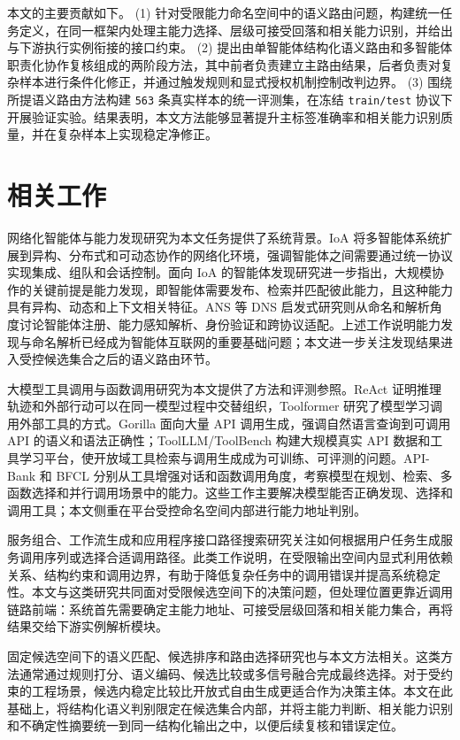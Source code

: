 \documentclass[10pt,a4paper,twocolumn,fontset=fandol]{ctexart}
\begin{document}
本文的主要贡献如下。
(1) 针对受限能力命名空间中的语义路由问题，构建统一任务定义，在同一框架内处理主能力选择、层级可接受回落和相关能力识别，并给出与下游执行实例衔接的接口约束。  
(2) 提出由单智能体结构化语义路由和多智能体职责化协作复核组成的两阶段方法，其中前者负责建立主路由结果，后者负责对复杂样本进行条件化修正，并通过触发规则和显式授权机制控制改判边界。  
(3) 围绕所提语义路由方法构建 \texttt{563} 条真实样本的统一评测集，在冻结 \texttt{train/test} 协议下开展验证实验。结果表明，本文方法能够显著提升主标签准确率和相关能力识别质量，并在复杂样本上实现稳定净修正。

\section{相关工作}

网络化智能体与能力发现研究为本文任务提供了系统背景。IoA 将多智能体系统扩展到异构、分布式和可动态协作的网络化环境，强调智能体之间需要通过统一协议实现集成、组队和会话控制\cite{ioa}。面向 IoA 的智能体发现研究进一步指出，大规模协作的关键前提是能力发现，即智能体需要发布、检索并匹配彼此能力，且这种能力具有异构、动态和上下文相关特征\cite{agentdiscovery}。ANS 等 DNS 启发式研究则从命名和解析角度讨论智能体注册、能力感知解析、身份验证和跨协议适配\cite{ans}。上述工作说明能力发现与命名解析已经成为智能体互联网的重要基础问题；本文进一步关注发现结果进入受控候选集合之后的语义路由环节。

大模型工具调用与函数调用研究为本文提供了方法和评测参照。ReAct 证明推理轨迹和外部行动可以在同一模型过程中交替组织\cite{react}，Toolformer 研究了模型学习调用外部工具的方式\cite{toolformer}。Gorilla 面向大量 API 调用生成，强调自然语言查询到可调用 API 的语义和语法正确性\cite{gorilla}；ToolLLM/ToolBench 构建大规模真实 API 数据和工具学习平台，使开放域工具检索与调用生成成为可训练、可评测的问题\cite{toollm}。API-Bank 和 BFCL 分别从工具增强对话和函数调用角度，考察模型在规划、检索、多函数选择和并行调用场景中的能力\cite{apibank,bfcl}。这些工作主要解决模型能否正确发现、选择和调用工具；本文侧重在平台受控命名空间内部进行能力地址判别。

服务组合、工作流生成和应用程序接口路径搜索研究关注如何根据用户任务生成服务调用序列或选择合适调用路径\cite{liang2026workflow}。此类工作说明，在受限输出空间内显式利用依赖关系、结构约束和调用边界，有助于降低复杂任务中的调用错误并提高系统稳定性。本文与这类研究共同面对受限候选空间下的决策问题，但处理位置更靠近调用链路前端：系统首先需要确定主能力地址、可接受层级回落和相关能力集合，再将结果交给下游实例解析模块。

固定候选空间下的语义匹配、候选排序和路由选择研究也与本文方法相关\cite{dpr,routellm}。这类方法通常通过规则打分、语义编码、候选比较或多信号融合完成最终选择。对于受约束的工程场景，候选内稳定比较比开放式自由生成更适合作为决策主体。本文在此基础上，将结构化语义判别限定在候选集合内部，并将主能力判断、相关能力识别和不确定性摘要统一到同一结构化输出之中，以便后续复核和错误定位。
\end{document}
